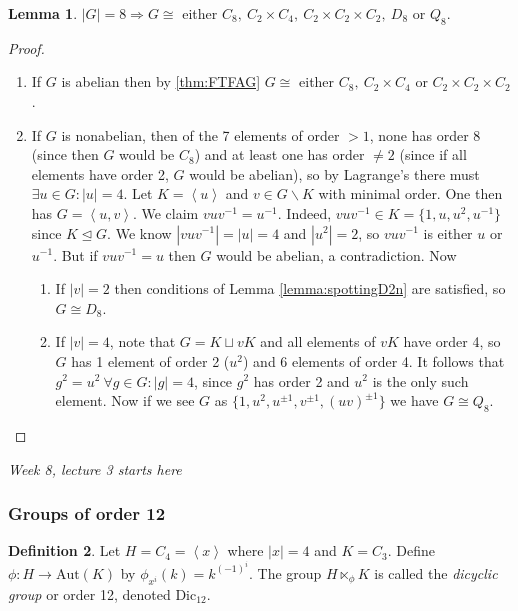 \documentclass[a4paper]{article}
\newcommand{\la}{\left\langle}
\newcommand{\ra}{\right\rangle}
\newcommand{\Dic}{\text{Dic}}
\newcommand{\Aut}{\text{Aut}}
\theoremstyle{definition}
\newtheorem{defn}{Definition}[subsection]
\newtheorem{lemma}[defn]{Lemma}
\begin{document}
\begin{lemma}
$|G|=8\Rightarrow G\cong$ either $C_8,\ C_2\times C_4,\ C_2\times C_2\times C_2,\ D_8$ or $Q_8$.
\end{lemma}
\begin{proof}
\begin{enumerate}
\item If $G$ is abelian then by \ref{thm:FTFAG} $G\cong$ either $C_8,\ C_2\times C_4$ or $C_2\times C_2\times C_2$.
\item If $G$ is nonabelian, then of the 7 elements of order $>1$, none has order 8 (since then $G$ would be $C_8$) and at least one has order $\neq 2$ (since if all elements have order 2, $G$ would be abelian), so by Lagrange's there must $\exists u\in G:|u|=4$. Let $K=\la u\ra$ and $v\in G\backslash K$ with minimal order. One then has $G=\la u,v\ra$. We claim $vuv^{-1}=u^{-1}$. Indeed, $vuv^{-1}\in K=\{1,u,u^2,u^{-1}\}$ since $K\unlhd G$. We know $|vuv^{-1}|=|u|=4$ and $|u^2|=2$, so $vuv^{-1}$ is either $u$ or $u^{-1}$. But if $vuv^{-1}=u$ then $G$ would be abelian, a contradiction. Now
\begin{enumerate}
\item If $|v|=2$ then conditions of Lemma \ref{lemma:spottingD2n} are satisfied, so $G\cong D_8$.
\item If $|v|=4$, note that $G=K\sqcup vK$ and all elements of $vK$ have order 4, so $G$ has 1 element of order 2 ($u^2$) and 6 elements of order 4. It follows that $g^2=u^2 \ \forall g\in G:|g|=4$, since $g^2$ has order 2 and $u^2$ is the only such element. Now if we see $G$ as $\{1,u^2,u^{\pm 1},v^{\pm 1},(uv)^{\pm 1}\}$ we have $G\cong Q_8$.
\end{enumerate}
\end{enumerate}
\end{proof}

\begin{flushright}
\textit{Week 8, lecture 3 starts here}
\end{flushright}

\subsubsection{Groups of order 12}
\begin{defn}
\label{defn:dic}
Let $H=C_4=\la x\ra$ where $|x|=4$ and $K=C_3$. Define $\phi:H\rightarrow\Aut(K)$ by $\phi_{x^i}(k)=k^{(-1)^i}$. The group $H\ltimes_\phi K$ is called the \textit{dicyclic group} or order 12, denoted $\Dic_{12}$.
\end{defn}
\end{document}
